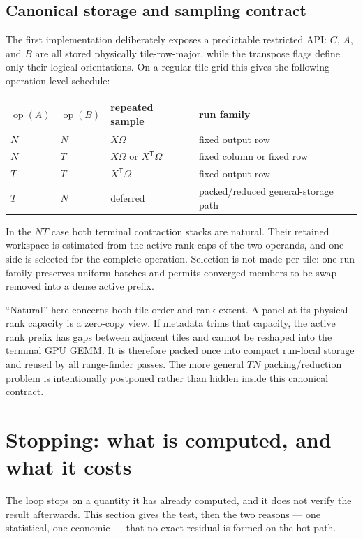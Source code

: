 \documentclass[11pt]{article}
\newcommand{\T}{\mathsf{T}}
\begin{document}
\subsection{Canonical storage and sampling contract}
\label{sec:canonicalcontract}

The first implementation deliberately exposes a predictable restricted API:
$C$, $A$, and $B$ are all stored physically tile-row-major, while the transpose
flags define only their logical orientations.  On a regular tile grid this
gives the following operation-level schedule:
\begin{center}
\begin{tabular}{llll}
\toprule
$\operatorname{op}(A)$ & $\operatorname{op}(B)$ & repeated sample & run family \\
\midrule
$N$ & $N$ & $X\Omega$ & fixed output row \\
$N$ & $T$ & $X\Omega$ or $X^{\T}\Omega$ & fixed column or fixed row \\
$T$ & $T$ & $X^{\T}\Omega$ & fixed output row \\
$T$ & $N$ & deferred & packed/reduced general-storage path \\
\bottomrule
\end{tabular}
\end{center}
In the $NT$ case both terminal contraction stacks are natural.  Their retained
workspace is estimated from the active rank caps of the two operands, and one
side is selected for the complete operation.  Selection is not made per tile:
one run family preserves uniform batches and permits converged members to be
swap-removed into a dense active prefix.

``Natural'' here concerns both tile order and rank extent.  A panel at its
physical rank capacity is a zero-copy view.  If metadata trims that capacity,
the active rank prefix has gaps between adjacent tiles and cannot be reshaped
into the terminal GPU GEMM.  It is therefore packed once into compact
run-local storage and reused by all range-finder passes.  The more general
$TN$ packing/reduction problem is intentionally postponed rather than hidden
inside this canonical contract.

\section{Stopping: what is computed, and what it costs}
\label{sec:energy}

The loop stops on a quantity it has already computed, and it does not verify the
result afterwards. This section gives the test, then the two reasons --- one
statistical, one economic --- that no exact residual is formed on the hot path.
\end{document}
